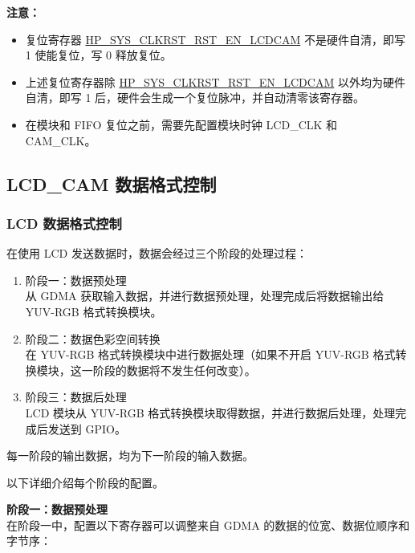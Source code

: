 \documentclass[main\_\_CN.tex]{subfiles}
\begin{document}
{\bfseries 注意：}
\begin{itemize}
    \item 复位寄存器 \hyperref[fielddesc:HPSYSCLKRSTRSTENLCDCAM]{HP\_SYS\_CLKRST\_RST\_EN\_LCDCAM} 不是硬件自清，即写 1 使能复位，写 0 释放复位。
    \item 上述复位寄存器除 \hyperref[fielddesc:HPSYSCLKRSTRSTENLCDCAM]{HP\_SYS\_CLKRST\_RST\_EN\_LCDCAM} 以外均为硬件自清，即写 1 后，硬件会生成一个复位脉冲，并自动清零该寄存器。
    \item 在模块和 FIFO 复位之前，需要先配置模块时钟 LCD\_CLK 和 CAM\_CLK。
\end{itemize}

\subsection{LCD\_CAM 数据格式控制}
\subsubsection{LCD 数据格式控制} \label{lcd_data_control}
在使用 LCD 发送数据时，数据会经过三个阶段的处理过程：
\begin{enumerate}
    \item 阶段一：数据预处理\\
    从 GDMA 获取输入数据，并进行数据预处理，处理完成后将数据输出给 YUV-RGB 格式转换模块。
    \item 阶段二：数据色彩空间转换\\
    在 YUV-RGB 格式转换模块中进行数据处理（如果不开启 YUV-RGB 格式转换模块，这一阶段的数据将不发生任何改变）。
    \item 阶段三：数据后处理\\
    LCD 模块从 YUV-RGB 格式转换模块取得数据，并进行数据后处理，处理完成后发送到 GPIO。

\end{enumerate}


\begin{tiplisting}
每一阶段的输出数据，均为下一阶段的输入数据。
\end{tiplisting}

以下详细介绍每个阶段的配置。

\textbf{阶段一：数据预处理} \\

在阶段一中，配置以下寄存器可以调整来自 GDMA 的数据的位宽、数据位顺序和字节序：
\end{document}
